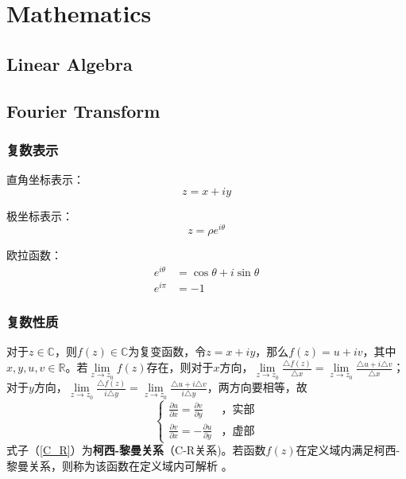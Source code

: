 \chapter{Mathematics}
\label{methematics}
\section{Linear Algebra}
\section{Fourier Transform}
\subsection{复数表示}
	直角坐标表示：
	\begin{equation*}
		z = x + iy
	\end{equation*}
	
	极坐标表示：
	\begin{equation*}
		z = \rho e^{i\theta}
	\end{equation*}
	
	欧拉函数：
	\begin{equation}
	\label{Euler_function}
	\begin{aligned}
		e^{i\theta} &= \cos\theta + i\sin\theta	\\
		e^{i\pi} &= -1
	\end{aligned}
	\end{equation}

\subsection{复数性质}
	对于$z\in \mathbb{C}$，则$f(z)\in \mathbb{C}$为复变函数，令$z=x+iy$，那么$f(z)=u+iv$，其中$x,y,u,v\in \mathbb{R}$。若$\lim\limits_{z\to z_0}f(z)$存在，则对于$x$方向，$\lim\limits_{z\to z_0}\frac{\triangle f(z)}{\triangle x} = \lim\limits_{z\to z_0}\frac{\triangle u + i\triangle v}{\triangle x}$；对于$y$方向，$\lim\limits_{z\to z_0}\frac{\triangle f(z)}{i\triangle y} = \lim\limits_{z\to z_0}\frac{\triangle u + i\triangle v}{i\triangle y}$，两方向要相等，故
	\begin{equation}
	\label{C_R}
	\begin{cases}
		\frac{\partial u}{\partial x}=\frac{\partial v}{\partial y} &\text{，实部}\\
		\frac{\partial v}{\partial x}=-\frac{\partial u}{\partial y} &\text{，虚部}
	\end{cases}
	\end{equation}
	式子（\ref{C_R}）为\textbf{柯西-黎曼关系}（C-R关系)。若函数$f(z)$在定义域内满足柯西-黎曼关系，则称为该函数在定义域内可解析 。
	
